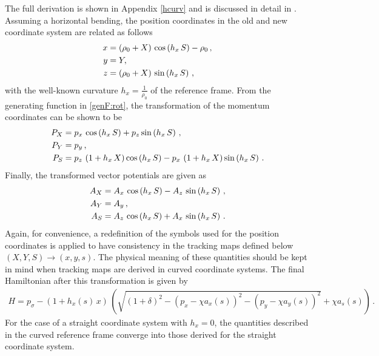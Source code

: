 %
%
%
%
The full derivation is shown in Appendix \ref{hcurv} and is discussed in detail in \cite{wolski2014beam}. Assuming a horizontal bending, the position coordinates in the old and new coordinate system are related as follows
%
\begin{align}
  x &= (\rho_0 + X) \, \cos \left( h_x \, S \right) - \rho_0 \, , \notag \\
  y &= Y , \\
  z &= (\rho_0 + X) \, \sin \left( h_x \, S \right)  \notag \, ,
\end{align}
with the well-known curvature $h_x = \frac{1}{\rho_0}$ of the reference frame. From the generating function in \eqref{genF:rot}, the transformation of the momentum coordinates can be shown to be
\begin{align}
P_X &= p_x \,  \cos \left( h_x \, S \right) + p_z  \sin \left( h_x \, S \right) \, , \notag \\
P_Y &= p_y \, , \\
P_S &= p_z \, \left( 1 + h_x \, X \right)  \cos \left( h_x \, S \right) - p_x \, \left( 1 + h_x \, X \right)  \sin \left( h_x \, S \right) \, . \notag
\end{align}
%
Finally, the transformed vector potentials are given as 
%
\begin{align}
  A_X &= A_x \, \cos \left( h_x \, S \right) - A_z \, \sin \left( h_x \, S \right) \, , \notag \\
  A_Y &= A_y \, , \\ 
  A_S &= A_z \, \cos \left( h_x \, S \right) + A_x \, \sin \left( h_x \, S \right) \, . \notag 
\end{align}
%
Again, for convenience, a redefinition of the symbols used for the position coordinates is applied to have consistency in the tracking maps defined below $(X,Y,S) \rightarrow (x,y,s)$. The physical meaning of these quantities should be kept in mind when tracking maps are derived in curved coordinate systems.
%
The final Hamiltonian after this transformation is given by~\cite{Fjellstrom:1642385}
%
\begin{align}
  H = p_\sigma - (1+h_x(s)\,x) \, \left(  \sqrt{ (1+\delta)^2  - (p_x - \chi a_x(s))^2 - (p_y-\chi a_y(s))^2} + \chi a_s(s)  \right)\,. \label{eq:rawHamiltonian}
\end{align}
%
%
For the case of a straight coordinate system with $h_x=0$, the quantities described in the curved reference frame converge into those derived for the straight coordinate system. 

